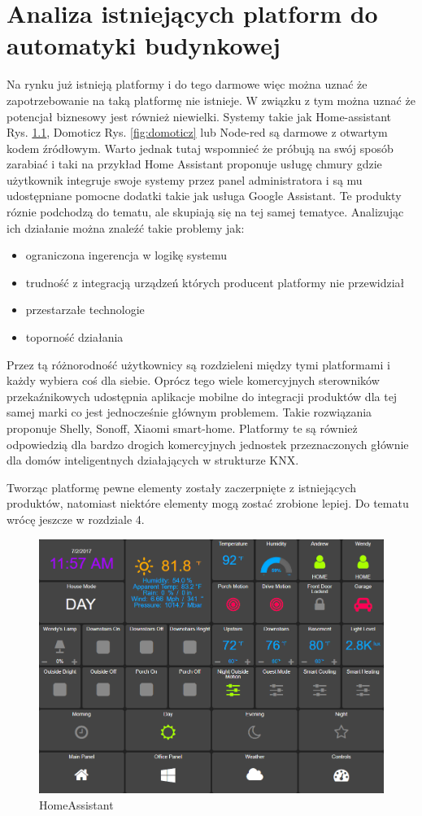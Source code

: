 \chapter{Analiza istniejących platform do automatyki budynkowej}
Na rynku już istnieją platformy i do tego darmowe więc można uznać że zapotrzebowanie na taką platformę nie istnieje. W związku z tym można uznać że potencjał biznesowy jest również niewielki. Systemy takie jak Home-assistant Rys.  \ref{fig:homeAssistant}, Domoticz Rys. \ref{fig:domoticz} lub Node-red są darmowe z otwartym kodem źródłowym. Warto jednak tutaj wspomnieć że próbują na swój sposób zarabiać i taki na przykład Home Assistant proponuje usługę chmury gdzie użytkownik integruje swoje systemy przez panel administratora i są mu udostępniane pomocne dodatki takie jak usługa Google Assistant.  
Te produkty róznie podchodzą do tematu, ale skupiają się na tej samej tematyce. Analizując ich działanie można znaleźć takie problemy jak:
\begin{itemize}
    \item ograniczona ingerencja w logikę systemu
    \item trudność z integracją urządzeń których producent platformy nie przewidział
    \item przestarzałe technologie
    \item toporność działania
\end{itemize}
Przez tą różnorodność użytkownicy są rozdzieleni między tymi platformami i każdy wybiera coś dla siebie.
Oprócz tego wiele komercyjnych sterowników przekaźnikowych udostępnia aplikacje mobilne do integracji produktów dla tej samej marki co jest jednocześnie głównym problemem. Takie rozwiązania proponuje Shelly, Sonoff, Xiaomi smart-home. Platformy te są również odpowiedzią dla bardzo drogich komercyjnych jednostek przeznaczonych  głównie dla domów inteligentnych działających w strukturze KNX. 
\par Tworząc platformę pewne elementy zostały zaczerpnięte z istniejących produktów, natomiast niektóre elementy mogą zostać zrobione lepiej. Do tematu wrócę jeszcze w rozdziale 4.

\begin{figure}[h]
  \includegraphics[width=\linewidth]{homeAssistant.png}
  \caption{HomeAssistant}
  \label{fig:homeAssistant}
\end{figure}

